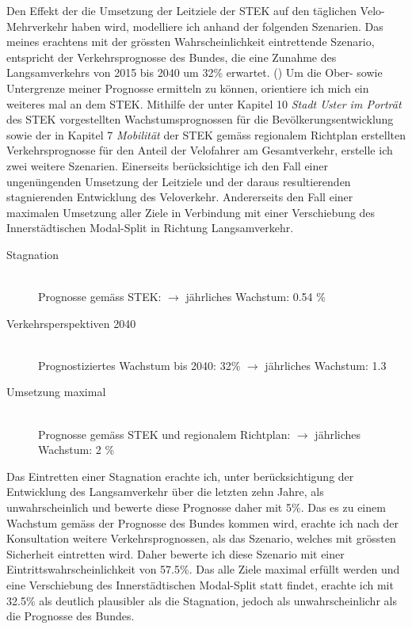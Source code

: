 Den Effekt der die Umsetzung der Leitziele der STEK auf den täglichen Velo-Mehrverkehr haben wird, modelliere ich anhand der folgenden Szenarien. Das meines erachtens mit der grössten Wahrscheinlichkeit eintrettende Szenario, entspricht der Verkehrsprognosse des Bundes, die eine Zunahme des Langsamverkehrs von 2015 bis 2040 um 32\% erwartet. (\cite{Perspektive2040}) 
Um die Ober- sowie Untergrenze meiner Prognosse ermitteln zu können, orientiere ich mich ein weiteres mal an dem STEK. Mithilfe der unter Kapitel 10 \textit{Stadt Uster im Porträt} des STEK vorgestellten Wachstumsprognossen für die Bevölkerungsentwicklung sowie der in Kapitel 7 \textit{Mobilität} der STEK gemäss regionalem Richtplan erstellten Verkehrsprognosse für den Anteil der Velofahrer am Gesamtverkehr, erstelle ich zwei weitere Szenarien. 
Einerseits berücksichtige ich den Fall einer ungenüngenden Umsetzung der Leitziele und der daraus resultierenden stagnierenden Entwicklung des Veloverkehr. Andererseits den Fall einer maximalen Umsetzung aller Ziele in Verbindung mit einer Verschiebung des Innerstädtischen Modal-Split in Richtung Langsamverkehr.

\begin{description}
\item[Stagnation] \hfill \\
Prognosse gemäss STEK: $\rightarrow$ jährliches Wachstum: 0.54 \% 
\item[Verkehrsperspektiven 2040] \hfill \\
Prognostiziertes Wachstum bis 2040: 32\% $\rightarrow$ jährliches Wachstum: 1.3 
\item[Umsetzung maximal] \hfill \\
Prognosse gemäss STEK und regionalem Richtplan: $\rightarrow$ jährliches Wachstum: 2 \% 
\end{description}

Das Eintretten einer Stagnation erachte ich, unter berücksichtigung der Entwicklung des Langsamverkehr über die letzten zehn Jahre, als unwahrscheinlich und bewerte diese Prognosse daher mit 5\%.
Das es zu einem Wachstum gemäss der Prognosse des Bundes kommen wird, erachte ich nach der Konsultation weitere Verkehrsprognossen, als das Szenario, welches mit grössten Sicherheit eintretten wird. Daher bewerte ich diese Szenario mit einer Eintrittswahrscheinlichkeit von 57.5\%. 
Das alle Ziele maximal erfüllt werden und eine Verschiebung des Innerstädtischen Modal-Split statt findet, erachte ich mit 32.5\% als deutlich plausibler als die Stagnation, jedoch als unwahrscheinlichr als die Prognosse des Bundes. 

